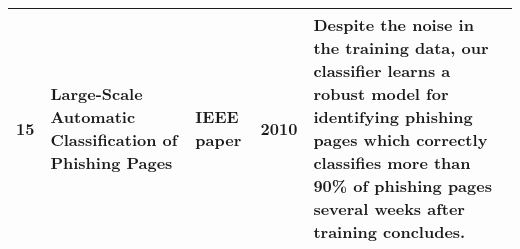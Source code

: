 {\begin{table}
\begin{tabular}{|p{.6cm}|p{3.5cm}|p{1.2cm}|p{1cm}|p{5.7cm}|}
\\
		\hline
		15 &Large-Scale Automatic Classification of Phishing Pages 
		&IEEE paper& 2010 & Despite the noise in the training data, our classifier learns a robust model for identifying phishing pages which correctly classifies more than 90\% of phishing pages several weeks after training concludes. 


\\
		\hline
		
	\end{tabular}
\end{table}
\\\\
}